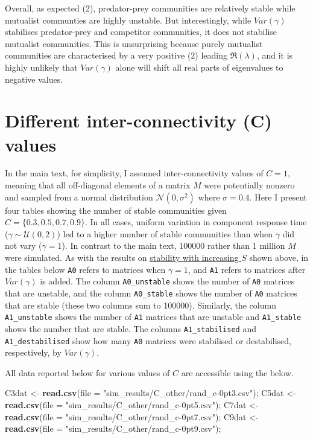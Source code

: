 \documentclass[]{article}
\newenvironment{Shaded}{\begin{snugshade}}{\end{snugshade}}
\newcommand{\KeywordTok}[1]{\textcolor[rgb]{0.13,0.29,0.53}{\textbf{{#1}}}}
\newcommand{\DataTypeTok}[1]{\textcolor[rgb]{0.13,0.29,0.53}{{#1}}}
\newcommand{\StringTok}[1]{\textcolor[rgb]{0.31,0.60,0.02}{{#1}}}
\newcommand{\NormalTok}[1]{{#1}}
\begin{document}
Overall, as expected (2), predator-prey communities are relatively
stable while mutualist communties are highly unstable. But
interestingly, while \(Var(\gamma)\) stabilises predator-prey and
competitor communities, it does not stabilise mutualist communities.
This is unsurprising because purely mutualist communities are
characterised by a very positive (2) leading \(\Re(\lambda)\), and it is
highly unlikely that \(Var(\gamma)\) alone will shift all real parts of
eigenvalues to negative values.

\hypertarget{connectance}{\section{Different inter-connectivity (C)
values}\label{connectance}}

In the main text, for simplicity, I assumed inter-connectivity values of
\(C = 1\), meaning that all off-diagonal elements of a matrix \(M\) were
potentially nonzero and sampled from a normal distribution
\(\mathcal{N}(0, \sigma^{2})\) where \(\sigma = 0.4\). Here I present
four tables showing the number of stable communities given
\(C = \{0.3, 0. 5, 0.7, 0.9 \}\). In all cases, uniform variation in
component response time (\(\gamma \sim \mathcal{U}(0, 2)\)) led to a
higher number of stable communities than when \(\gamma\) did not vary
(\(\gamma = 1\)). In contrast to the main text, 100000 rather than 1
million \(M\) were simulated. As with the results on
\protect\hyperlink{IncrS}{stability with increasing \(S\)} shown above,
in the tables below \texttt{A0} refers to matrices when \(\gamma = 1\),
and \texttt{A1} refers to matrices after \(Var(\gamma)\) is added. The
column \texttt{A0\_unstable} shows the number of \texttt{A0} matrices
that are unstable, and the column \texttt{A0\_stable} shows the number
of \texttt{A0} matrices that are stable (these two columns sum to
100000). Similarly, the column \texttt{A1\_unstable} shows the number of
\texttt{A1} matrices that are unstable and \texttt{A1\_stable} shows the
number that are stable. The columns \texttt{A1\_stabilised} and
\texttt{A1\_destabilised} show how many \texttt{A0} matrices were
stabilised or destabilised, respectively, by \(Var(\gamma)\).

All data reported below for various values of \(C\) are accessible using
the below.

\begin{Shaded}
\begin{Highlighting}[]
\NormalTok{C3dat <-}\StringTok{ }\KeywordTok{read.csv}\NormalTok{(}\DataTypeTok{file =} \StringTok{"sim_results/C_other/rand_c-0pt3.csv"}\NormalTok{);}
\NormalTok{C5dat <-}\StringTok{ }\KeywordTok{read.csv}\NormalTok{(}\DataTypeTok{file =} \StringTok{"sim_results/C_other/rand_c-0pt5.csv"}\NormalTok{);}
\NormalTok{C7dat <-}\StringTok{ }\KeywordTok{read.csv}\NormalTok{(}\DataTypeTok{file =} \StringTok{"sim_results/C_other/rand_c-0pt7.csv"}\NormalTok{);}
\NormalTok{C9dat <-}\StringTok{ }\KeywordTok{read.csv}\NormalTok{(}\DataTypeTok{file =} \StringTok{"sim_results/C_other/rand_c-0pt9.csv"}\NormalTok{);}
\end{Highlighting}
\end{Shaded}
\end{document}
